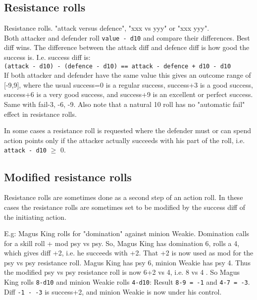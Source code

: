 \subsection*{Resistance rolls}
Resistance rolls. "attack versus defence",  "xxx vs yyy" or "xxx \vs yyy".\\
Both attacker and defender roll \verb|value - d10| and compare their differences. Best diff wins. The difference between the attack diff and defence diff is how good the success is. I.e. success diff is:\\
\verb|(attack - d10) - (defence - d10) == attack - defence + d10 - d10|\\ If both attacker and defender have the same value this gives an outcome range of [-9,9], where the usual success=0 is a regular success, success+3 is a good success, success+6 is a very good success, and success+9 is an excellent or perfect success. Same with fail-3, -6, -9. Also note that a natural 10 roll has no "automatic fail" effect in resistance rolls.

In some cases a resistance roll is requested where the defender must or can spend action points only if the attacker actually succeeds with his part of the roll, i.e. \verb|attack - d10| $\geq$ 0.


\subsection*{Modified resistance rolls}
Resistance rolls are sometimes done as a second step of an action roll. In these cases the resistance rolls are sometimes set to be modified by the success diff of the initiating action.

E.g: Magus King rolls for "domination" against minion Weakie. Domination calls for a skill roll + mod psy vs psy. So, Magus King has domination 6, rolls a 4, which gives diff +2, i.e. he succeeds with +2. That +2 is now used as mod for the psy vs psy resistance roll. Magus King has psy 6, minion Weakie has psy 4. Thus the modified psy vs psy resistance roll is now 6+2 vs 4, i.e. 8 vs 4
. So Magus King rolls \verb|8-d10| and minion Weakie rolls \verb|4-d10|: Result \verb|8-9 = -1| and \verb|4-7 = -3|. Diff \verb|-1 - -3| is success+2, and minion Weakie is now under his control.

